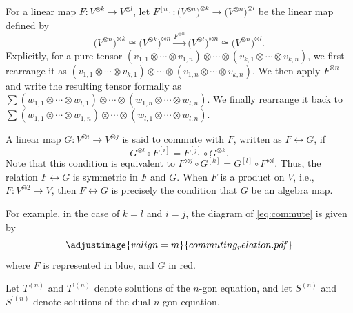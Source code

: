 \documentclass[10pt,a4paper]{amsart}
\numberwithin{equation}{section}
\theoremstyle{definition}
\begin{document}
For a linear map $F\colon V^{\otimes k}\to V^{\otimes l}$, let $F^{[n]}\colon \bigl(V^{\otimes n}\bigr)^{\otimes k} \to \bigl(V^{\otimes n}\bigr)^{\otimes l}$ be the linear map defined by
\begin{equation*}
\bigl(V^{\otimes n}\bigr)^{\otimes k}\cong \bigl(V^{\otimes k}\bigr)^{\otimes n} \xrightarrow{F^{\otimes n}} \bigl(V^{\otimes l}\bigr)^{\otimes n}\cong \bigl(V^{\otimes n}\bigr)^{\otimes l}.
\end{equation*}
Explicitly, for a pure tensor $(v_{1,1}\otimes\cdots\otimes v_{1,n})\otimes\cdots\otimes
(v_{k,1}\otimes\cdots\otimes v_{k,n})$, we first rearrange it as $(v_{1,1}\otimes\cdots\otimes v_{k,1})\otimes\cdots\otimes
(v_{1,n}\otimes\cdots\otimes v_{k,n})$. We then apply $F^{\otimes n}$ and write the resulting tensor formally as $\sum
(w_{1,1}\otimes\cdots\otimes w_{l,1})\otimes\cdots\otimes
(w_{1,n}\otimes\cdots\otimes w_{l,n})$. We finally rearrange it back to $\sum
(w_{1,1}\otimes\cdots\otimes w_{1,n})\otimes\cdots\otimes
(w_{l,1}\otimes\cdots\otimes w_{l,n})$.

A linear map $G\colon V^{\otimes i}\to V^{\otimes j}$ is said to commute with $F$, written as $F \leftrightarrow G$, if
\begin{equation}
G^{\otimes l}\circ F^{[i]} = F^{[j]}\circ G^{\otimes k}.\label{eq:commute}
\end{equation}
Note that this condition is equivalent to $F^{\otimes j}\circ G^{[k]} = G^{[l]}\circ F^{\otimes i}$. Thus, the relation $F \leftrightarrow G$ is symmetric in $F$ and $G$.
When $F$ is a product on $V$, i.e., $F\colon V^{\otimes 2}\to V$, then $F\leftrightarrow G$ is precisely the condition that $G$ be an algebra map.

For example, in the case of $k=l$ and $i=j$, the diagram of \eqref{eq:commute} is given by
\begin{equation*}
 \adjustimage{valign=m}{commuting_relation.pdf}
\end{equation*}
where $F$ is represented in blue, and $G$ in red.

Let $T^{(n)}$ and $T^{\prime(n)}$ denote solutions of the $n$-gon equation, and let $S^{(n)}$ and $S^{\prime(n)}$ denote solutions of the dual $n$-gon equation.
\end{document}
